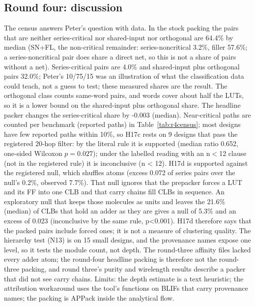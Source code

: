 
\subsection{Round four: discussion}
\label{sec:r4-discussion}
The census answers Peter's question with data. In the stock packing the pairs that are neither series-critical nor shared-input nor orthogonal are 64.4\% by median (SN+FL, the non-critical remainder: series-noncritical 3.2\%, filler 57.6\%; a series-noncritical pair does share a direct net, so this is not a share of pairs without a net). Series-critical pairs are
4.0\% and shared-input plus orthogonal pairs 32.0\%; Peter's 10/75/15 was an illustration of what the classification data could teach, not a guess to test; these measured shares are the result.
The orthogonal class counts same-word pairs, and words cover about half the LUTs, so it is a lower bound on the shared-input plus orthogonal share. The headline packer changes the series-critical share by -0.003 (median).
Near-critical paths are counted per benchmark (reported paths) in Table~\ref{tab:r4census}; most designs have few reported paths within 10\%, so H17c rests on 9 designs that pass the registered 20-hop filter: by the literal rule it is supported (median ratio 0.652, one-sided Wilcoxon $p=0.027$); under the labelled reading with an n$<$12 clause (not in the registered rule) it is inconclusive (n < 12).
H17d is supported against the registered null, which shuffles atoms (excess 0.072 of series pairs over the null's 0.2\%, observed 7.7\%). That null ignores that the prepacker forces a LUT and its FF into one CLB and that carry chains fill CLBs in sequence. An exploratory null that keeps those molecules as units and leaves the 21.6\% (median) of CLBs that hold an adder as they are gives a null of 5.3\% and an excess of 0.023 (inconclusive by the same rule, p<0.001). H17d therefore says that the packed pairs include forced ones; it is not a measure of clustering quality.
The hierarchy test (N13) is on 15 small designs, and the provenance names expose one level, so it tests the module count, not depth. The round-three affinity files lacked every adder atom; the round-four headline
packing is therefore not the round-three packing, and round three's purity and wirelength results describe a packer that did not see carry chains.
Limits: the depth estimate is a text heuristic; the attribution workaround uses the tool's functions on BLIFs that carry provenance names; the packing is APPack inside the analytical flow.
